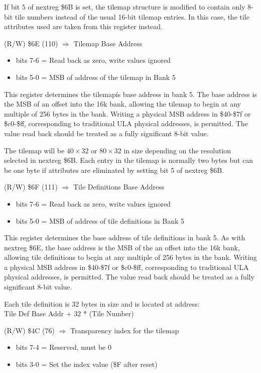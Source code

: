 If bit 5 of nextreg \$6B is set, the tilemap structure is modified to
contain only 8-bit tile numbers instead of the usual 16-bit tilemap
entries. In this case, the tile attributes used are taken from this
register instead.

(R/W) \$6E (110) $\Rightarrow$ Tilemap Base Address
\begin{itemize}
\item[] bits 7-6 = Read back as zero, write values ignored
\item[] bits 5-0 = MSB of address of the tilemap in Bank 5
\end{itemize}

This register determines the tilemapís base address in bank 5. The
base address is the MSB of an offset into the 16k bank, allowing the
tilemap to begin at any multiple of 256 bytes in the bank. Writing a
physical MSB address in \$40-\$7f or \$c0-\$ff, corresponding to
traditional ULA physical addresses, is permitted. The value read back
should be treated as a fully significant 8-bit value.

The tilemap will be $40\times32$ or $80\times32$ in size depending on
the resolution selected in nextreg \$6B. Each entry in the tilemap is
normally two bytes but can be one byte if attributes are eliminated by
setting bit 5 of nextreg \$6B.

(R/W) \$6F (111) $\Rightarrow$ Tile Definitions Base Address
\begin{itemize}
\item[] bits 7-6 = Read back as zero, write values ignored
\item[] bits 5-0 = MSB of address of tile definitions in Bank 5
\end{itemize}

This register determines the base address of tile definitions in bank
5. As with nextreg \$6E, the base address is the MSB of the an offset
into the 16k bank, allowing tile definitions to begin at any multiple
of 256 bytes in the bank. Writing a physical MSB address in \$40-\$7f
or \$c0-\$ff, corresponding to traditional ULA physical addresses, is
permitted. The value read back should be treated as a fully
significant 8-bit value.

Each tile definition is 32 bytes in size and is located at address:\\
Tile Def Base Addr + 32 * (Tile Number)

(R/W) \$4C (76) $\Rightarrow$ Transparency index for the tilemap
\begin{itemize}
\item[] bits 7-4 = Reserved, must be 0
\item[] bits 3-0 = Set the index value (\$F after reset)
\end{itemize}

